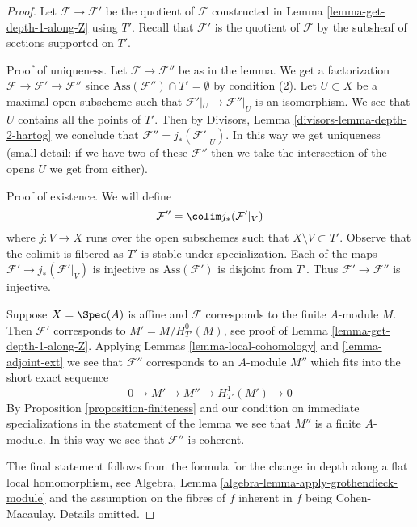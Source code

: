 \begin{proof}
Let $\mathcal{F} \to \mathcal{F}'$ be the quotient of $\mathcal{F}$
constructed in Lemma \ref{lemma-get-depth-1-along-Z} using $T'$.
Recall that $\mathcal{F}'$ is the quotient of $\mathcal{F}$
by the subsheaf of sections supported on $T'$.

\medskip\noindent
Proof of uniqueness. Let $\mathcal{F} \to \mathcal{F}''$
be as in the lemma. We get a factorization
$\mathcal{F} \to \mathcal{F}' \to \mathcal{F}''$
since $\text{Ass}(\mathcal{F}'') \cap T' = \emptyset$
by condition (2). Let $U \subset X$ be a maximal open
subscheme such that $\mathcal{F}'|_U \to \mathcal{F}''|_U$
is an isomorphism. We see that $U$ contains all the points of $T'$.
Then by Divisors, Lemma \ref{divisors-lemma-depth-2-hartog}
we conclude that $\mathcal{F}'' = j_*(\mathcal{F}'|_U)$.
In this way we get uniqueness (small detail: if we have two
of these $\mathcal{F}''$ then we take the intersection of the opens $U$
we get from either).

\medskip\noindent
Proof of existence. We will define
$$
\mathcal{F}'' = \colim j_*(\mathcal{F}'|_V)
$$
where $j : V \to X$ runs over the open subschemes such that
$X \setminus V \subset T'$. Observe that the colimit is filtered
as $T'$ is stable under specialization. Each of the
maps $\mathcal{F}' \to j_*(\mathcal{F}'|_V)$ is injective
as $\text{Ass}(\mathcal{F}')$ is disjoint from $T'$.
Thus $\mathcal{F}' \to \mathcal{F}''$ is injective.

\medskip\noindent
Suppose $X = \Spec(A)$ is affine and $\mathcal{F}$
corresponds to the finite $A$-module $M$. Then $\mathcal{F}'$
corresponds to $M' = M / H^0_{T'}(M)$, see proof of
Lemma \ref{lemma-get-depth-1-along-Z}. Applying
Lemmas \ref{lemma-local-cohomology} and \ref{lemma-adjoint-ext}
we see that $\mathcal{F}''$ corresponds to an $A$-module
$M''$ which fits into the short exact sequence
$$
0 \to M' \to M'' \to H^1_{T'}(M') \to 0
$$
By Proposition \ref{proposition-finiteness} and our condition
on immediate specializations in the statement of the lemma
we see that $M''$ is a finite $A$-module. In this way
we see that $\mathcal{F}''$ is coherent.

\medskip\noindent
The final statement follows from the formula for the change in
depth along a flat local homomorphism, see
Algebra, Lemma \ref{algebra-lemma-apply-grothendieck-module}
and the assumption on the fibres of $f$ inherent in $f$ being
Cohen-Macaulay. Details omitted.
\end{proof}

